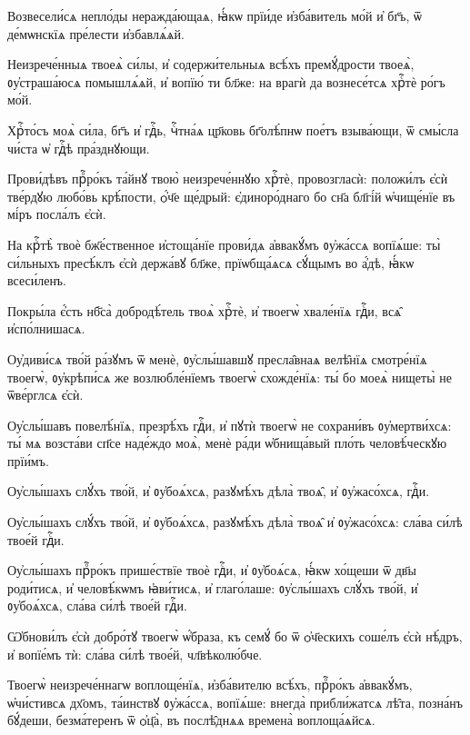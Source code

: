 \hKv Возвесели́сѧ непло́ды неражда́ющаѧ, ꙗ҆́кѡ прїи́де  и҆зба́витель мо́й и҆ бг҃ъ, ѿ де́мѡнскїѧ пре́лести  и҆збавлѧ́ѧй. 

\hKv Неизрече́нныѧ твоеѧ̀ си́лы, и҆ содержи́тельныѧ всѣ́хъ  премꙋ́дрости твоеѧ̀, ᲂу҆страша́юсѧ помышлѧ́ѧй, и҆ вопїю́ ти  бл҃же: на врагѝ да вознесе́тсѧ хрⷭ҇тѐ ро́гъ мо́й. 
%

\hKv Хрⷭ҇то́съ моѧ̀ си́ла, бг҃ъ и҆ гдⷭ҇ь, чⷭ҇тна́ѧ цр҃ковь  бг҃олѣ́пнѡ пое́тъ взыва́ющи, ѿ смы́сла чи́ста ѡ҆ гдⷭ҇ѣ  пра́зднꙋющи. 
%

\hKv Прови́дѣвъ прⷪ҇ро́къ та́йнꙋ  твою̀ неизрече́ннꙋю хрⷭ҇тѐ, провозгласѝ:  положи́лъ є҆сѝ тве́рдꙋю любо́вь крѣ́пости,  ѻ҆́ч҃е ще́дрый: є҆диноро́днаго бо сн҃а бл҃гі́й ѡ҆чище́нїе  въ мі́ръ посла́лъ є҆сѝ. 
%

\hKv На крⷭ҇тѣ̀ твоѐ бж҃е́ственное  и҆стоща́нїе прови́дѧ а҆ввакꙋ́мъ ᲂу҆жа́ссѧ вопїѧ́ше: ты̀  си́льныхъ пресѣ́клъ є҆сѝ держа́вꙋ бл҃же, прїѡбща́ѧсѧ  сꙋ́щымъ во а҆́дѣ, ꙗ҆́кѡ всеси́ленъ. 
%

\hKv Покры́ла є҆́сть нб҃са̀ добродѣ́тель твоѧ̀ хрⷭ҇тѐ, и҆  твоегѡ̀ хвале́нїѧ гдⷭ҇и, всѧ̑ и҆спо́лнишасѧ. 

\hKv Оу҆диви́сѧ тво́й ра́зꙋмъ ѿ менѐ, ᲂу҆слы́шавшꙋ  пресла̑внаѧ велѣ̑нїѧ смотре́нїѧ твоегѡ̀, ᲂу҆крѣпи́сѧ же  возлюбле́нїемъ твоегѡ̀ схожде́нїѧ: ты́ бо моеѧ̀ нищеты̀ не  ѿве́рглсѧ є҆сѝ. 

\hKv Оу҆слы́шавъ повелѣ́нїѧ, презрѣ́хъ гдⷭ҇и, и҆ пꙋтѝ твоегѡ̀  не сохрани́въ ᲂу҆мертви́хсѧ: ты́ мѧ возста́ви сп҃се  наде́ждо моѧ̀, менѐ ра́ди ѡ҆бнища́вый пло́ть человѣ́ческꙋю  прїи́мъ.  

\hKv Оу҆слы́шахъ слꙋ́хъ тво́й, и҆ ᲂу҆боѧ́хсѧ, разꙋмѣ́хъ дѣла̀  твоѧ̑, и҆ ᲂу҆жасо́хсѧ, гдⷭ҇и. 

\hKv Оу҆слы́шахъ слꙋ́хъ тво́й, и҆ ᲂу҆боѧ́хсѧ, разꙋмѣ́хъ дѣла̀  твоѧ̑ и҆ ᲂу҆жасо́хсѧ: сла́ва си́лѣ твое́й гдⷭ҇и. 

\hKv Оу҆слы́шахъ прⷪ҇ро́къ прише́ствїе твоѐ гдⷭ҇и, и҆  ᲂу҆боѧ́сѧ, ꙗ҆́кѡ хо́щеши ѿ дв҃ы роди́тисѧ, и҆  человѣ́кѡмъ ꙗ҆ви́тисѧ, и҆ глаго́лаше: ᲂу҆слы́шахъ слꙋ́хъ  тво́й, и҆ ᲂу҆боѧ́хсѧ, сла́ва си́лѣ твое́й гдⷭ҇и. 

\hKv Ѡ҆бнови́лъ є҆сѝ добро́тꙋ твоегѡ̀ ѡ҆́браза, къ семꙋ́ бо ѿ  ѻ҆ч҃ескихъ соше́лъ є҆сѝ нѣ́дръ, и҆ вопїе́мъ тѝ: сла́ва  си́лѣ твое́й, чл҃вѣколю́бче. 

\hKv Твоегѡ̀ неизрече́ннагѡ воплоще́нїѧ, и҆зба́вителю всѣ́хъ,  прⷪ҇ро́къ а҆ввакꙋ́мъ, ѡ҆чи́стивсѧ дх҃омъ, та́инствꙋ  ᲂу҆жа́ссѧ, вопїѧ́ше: внегда̀ прибли́жатсѧ лѣ̑та, позна́нъ  бꙋ́деши, безма́теренъ ѿ ѻ҆ц҃а̀, въ послѣ̑днѧѧ времена̀  воплоща́ѧйсѧ.  

